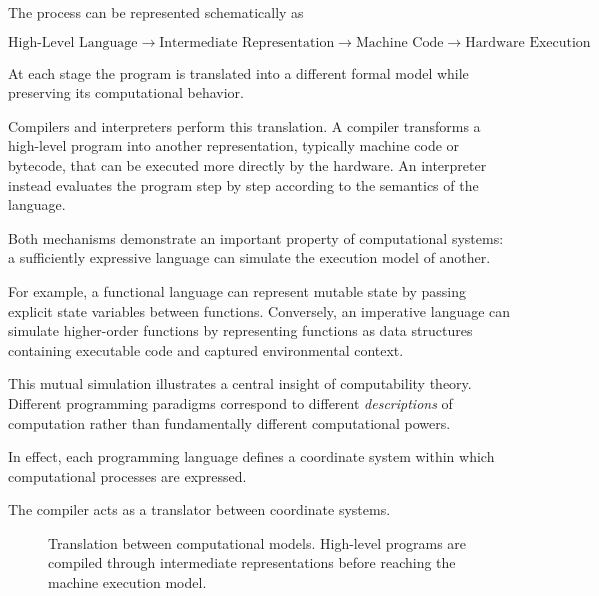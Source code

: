 \documentclass[11pt]{article}
\theoremstyle{definition}
\begin{document}
The process can be represented schematically as

\[
\text{High-Level Language}
\rightarrow
\text{Intermediate Representation}
\rightarrow
\text{Machine Code}
\rightarrow
\text{Hardware Execution}
\]

At each stage the program is translated into a different formal model
while preserving its computational behavior.

Compilers and interpreters perform this translation. A compiler
transforms a high-level program into another representation, typically
machine code or bytecode, that can be executed more directly by the
hardware. An interpreter instead evaluates the program step by step
according to the semantics of the language.

Both mechanisms demonstrate an important property of computational
systems: a sufficiently expressive language can simulate the execution
model of another.

For example, a functional language can represent mutable state by
passing explicit state variables between functions. Conversely, an
imperative language can simulate higher-order functions by representing
functions as data structures containing executable code and captured
environmental context.

This mutual simulation illustrates a central insight of computability
theory. Different programming paradigms correspond to different
\emph{descriptions} of computation rather than fundamentally different
computational powers.

In effect, each programming language defines a coordinate system within
which computational processes are expressed.

The compiler acts as a translator between coordinate systems.

\begin{figure}[h]
\centering
{}
\caption{Translation between computational models. High-level programs
are compiled through intermediate representations before reaching the
machine execution model.}
\label{fig:compiler_translation}
\end{figure}
\end{document}
